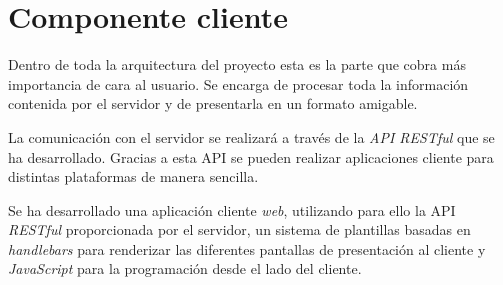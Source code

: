 \section{Componente cliente}

Dentro de toda la arquitectura del proyecto esta es la parte que cobra más importancia de cara al usuario. Se encarga de procesar toda la información contenida por el servidor y de presentarla en un formato amigable.

La comunicación con el servidor se realizará a través de la \emph{API RESTful} que se ha desarrollado. Gracias a esta API se pueden realizar aplicaciones cliente para distintas plataformas de manera sencilla.

Se ha desarrollado una aplicación cliente \emph{web}, utilizando para ello la API \emph{RESTful} proporcionada por el servidor, un sistema de plantillas basadas en \emph{handlebars} para renderizar las diferentes pantallas de presentación al cliente y \emph{JavaScript} para la programación desde el lado del cliente.